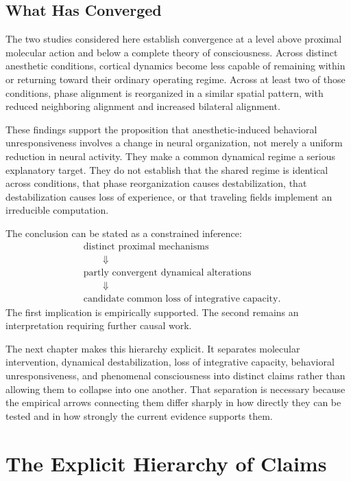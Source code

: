 \documentclass[11pt]{book}
\begin{document}
\section*{What Has Converged}

The two studies considered here establish convergence at a level above proximal molecular action and below a complete theory of consciousness. Across distinct anesthetic conditions, cortical dynamics become less capable of remaining within or returning toward their ordinary operating regime. Across at least two of those conditions, phase alignment is reorganized in a similar spatial pattern, with reduced neighboring alignment and increased bilateral alignment.

These findings support the proposition that anesthetic-induced behavioral unresponsiveness involves a change in neural organization, not merely a uniform reduction in neural activity. They make a common dynamical regime a serious explanatory target. They do not establish that the shared regime is identical across conditions, that phase reorganization causes destabilization, that destabilization causes loss of experience, or that traveling fields implement an irreducible computation.

The conclusion can be stated as a constrained inference:
\[
\begin{aligned}
&\text{distinct proximal mechanisms}
\\
&\qquad\Downarrow
\\
&\text{partly convergent dynamical alterations}
\\
&\qquad\Downarrow
\\
&\text{candidate common loss of integrative capacity}.
\end{aligned}
\]
The first implication is empirically supported. The second remains an interpretation requiring further causal work.

The next chapter makes this hierarchy explicit. It separates molecular intervention, dynamical destabilization, loss of integrative capacity, behavioral unresponsiveness, and phenomenal consciousness into distinct claims rather than allowing them to collapse into one another. That separation is necessary because the empirical arrows connecting them differ sharply in how directly they can be tested and in how strongly the current evidence supports them.

\chapter{The Explicit Hierarchy of Claims}
\end{document}
